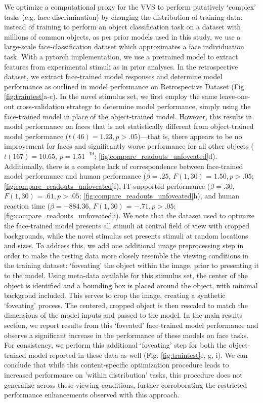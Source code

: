 \documentclass[11pt]{article}
\begin{document}
We optimize a computational proxy for the VVS to perform putatively ‘complex’ tasks (e.g. face discrimination) by changing the distribution of training data: instead of training to perform an object classification task on a dataset with millions of common objects, as per prior models used in this study, we use a large-scale face-classification dataset which approximates a face individuation task\cite{parkhi2015deep}. With a pytorch implementation, we use a pretrained model to extract features from experimental stimuli as in prior analyses. In the retrospective dataset, we extract face-trained model responses and determine model performance as outlined in model performance on Retrospective Dataset (Fig. \ref{fig:traintest}a-c). In the novel stimulus set, we first employ the same leave-one-out cross-validation strategy to determine model performance, simply using the face-trained model in place of the object-trained model. However, this results in model performance on faces that is not statistically different from object-trained model performance ($t(46)=1.23, p > .05$)---that is, there appears to be no improvement for faces and significantly worse performance for all other objects ($t(167)=10.65$, $p=1.51^{-19}$; \ref{fig:compare_readouts_unfoveated}d). Additionally, there is a complete lack of correspondence between face-trained model performance and human performance ($\beta = .25$, $F(1, 30)$ = $1.50, p > .05$; \ref{fig:compare_readouts_unfoveated}f), IT-supported performance ($\beta = .30$, $F(1, 30)$ = $.61, p > .05$; \ref{fig:compare_readouts_unfoveated}h), and human reaction time ($\beta = -884.36$, $F(1, 30)$ = $-.71, p > .05$: \ref{fig:compare_readouts_unfoveated}i). We note that the dataset used to optimize the face-trained model presents all stimuli at central field of view with cropped backgrounds, while the novel stimulus set presents stimuli at random locations and sizes. To address this, we add one additional image preprocessing step in order to make the testing data more closely resemble the viewing conditions in the training dataset: `foveating' the object within the image, prior to presenting it to the model. Using meta-data available for this stimulus set, the center of the object is identified and a bounding box is placed around the object, with minimal backgroud included. This serves to crop the image, creating a synthetic `foveating' process. The centered, cropped object is then rescaled to match the dimensions of the model inputs and passed to the model. In the main results section, we report results from this `foveated' face-trained model performance and observe a significant increase in the performance of these models on face tasks. For consistency, we perform this additional `foveating' step for both the object-trained model reported in these data as well (Fig. \ref{fig:traintest}e, g, i). We can conclude that while this content-specific optimization procedure leads to increased performance on 'within distribution' tasks, this procedure does not generalize across these viewing conditions, further corroborating the restricted performance enhancements observed with this approach. 
\end{document}
